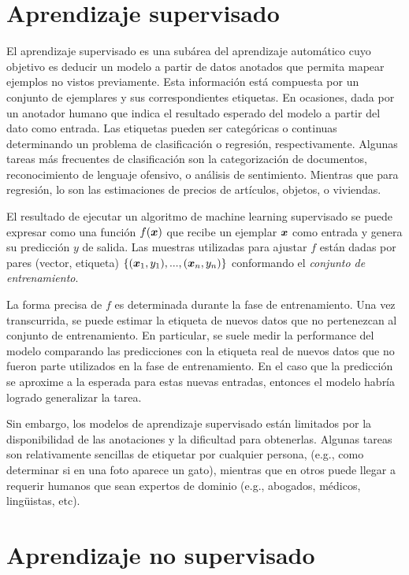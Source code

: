 \section{Aprendizaje supervisado}

El aprendizaje supervisado es una subárea del aprendizaje automático cuyo
objetivo es deducir un modelo a partir de datos anotados que permita mapear
ejemplos no vistos previamente. Esta información está compuesta por un conjunto
de ejemplares y sus correspondientes etiquetas. En ocasiones, dada por un
anotador humano que indica el resultado esperado del modelo a partir del dato
como entrada. Las etiquetas pueden ser categóricas o continuas determinando un
problema de clasificación o regresión, respectivamente. Algunas tareas más
frecuentes de clasificación son la categorización de documentos, reconocimiento
de lenguaje ofensivo, o análisis de sentimiento. Mientras que para regresión, lo
son las estimaciones de precios de artículos, objetos, o viviendas.

El resultado de ejecutar un algoritmo de machine learning supervisado se puede
expresar como una función $f(\boldsymbol{x})$ que recibe un ejemplar $\boldsymbol{x}$ como
entrada y genera su predicción $y$ de salida. Las muestras utilizadas para
ajustar $f$ están dadas por pares (vector, etiqueta) $\{(\boldsymbol{x}_1, y_1), ...,
(\boldsymbol{x}_n, y_n)\}$ conformando el \emph{conjunto de entrenamiento}.

La forma precisa de $f$ es determinada durante la fase de entrenamiento. Una vez
transcurrida, se puede estimar la etiqueta de nuevos datos que no pertenezcan al
conjunto de entrenamiento. En particular, se suele medir la performance del
modelo comparando las predicciones con la etiqueta real de nuevos datos que no
fueron parte utilizados en la fase de entrenamiento. En el caso que la
predicción se aproxime a la esperada para estas nuevas entradas, entonces el
modelo habría logrado generalizar la tarea.

Sin embargo, los modelos de aprendizaje supervisado están limitados por la
disponibilidad de las anotaciones y la dificultad para obtenerlas. Algunas
tareas son relativamente sencillas de etiquetar por cualquier persona, (e.g.,
como determinar si en una foto aparece un gato), mientras que en otros puede
llegar a requerir humanos que sean expertos de dominio (e.g., abogados, médicos,
lingüistas, etc).

\section{Aprendizaje no supervisado}


